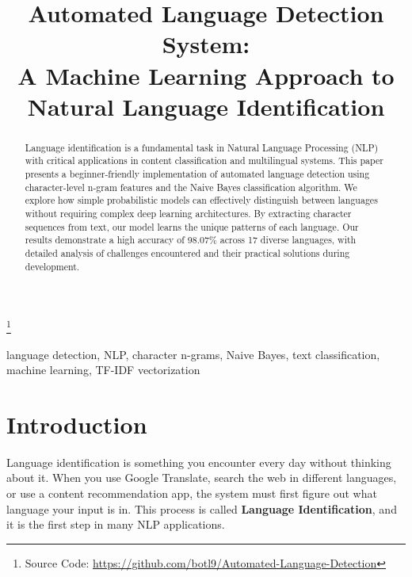 \documentclass[conference]{IEEEtran}
\begin{document}
\title{Automated Language Detection System: \\
A Machine Learning Approach to Natural Language Identification}

\author{
\and
{}
\and
{}
}

\maketitle

\begingroup
\renewcommand\thefootnote{}\footnote{Source Code: \url{https://github.com/botl9/Automated-Language-Detection}}
\addtocounter{footnote}{-1}
\endgroup

\begin{abstract}
Language identification is a fundamental task in Natural Language Processing (NLP) with critical applications in content classification and multilingual systems. This paper presents a beginner-friendly implementation of automated language detection using character-level n-gram features and the Naive Bayes classification algorithm. We explore how simple probabilistic models can effectively distinguish between languages without requiring complex deep learning architectures. By extracting character sequences from text, our model learns the unique patterns of each language. Our results demonstrate a high accuracy of 98.07\% across 17 diverse languages, with detailed analysis of challenges encountered and their practical solutions during development.
\end{abstract}

\begin{IEEEkeywords}
language detection, NLP, character n-grams, Naive Bayes, text classification, machine learning, TF-IDF vectorization
\end{IEEEkeywords}

\section{Introduction}

Language identification is something you encounter every day without thinking about it. When you use Google Translate, search the web in different languages, or use a content recommendation app, the system must first figure out what language your input is in. This process is called \textbf{Language Identification}, and it is the first step in many NLP applications.
\end{document}
